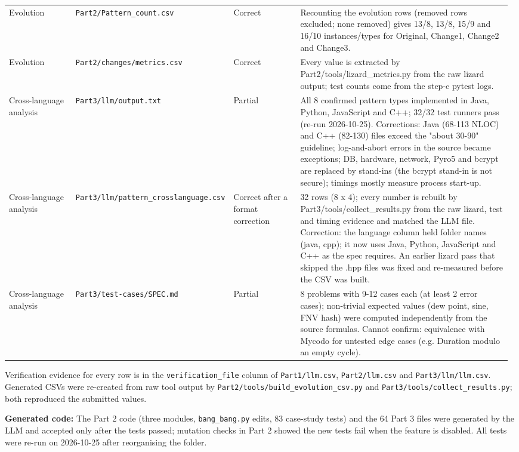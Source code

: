 \documentclass[11pt,a4paper]{article}
\newcommand{\field}[2]{\textbf{#1:} #2\par}
\begin{document}
{\begin{longtable}{@{}P{0.14\linewidth}P{0.25\linewidth}P{0.14\linewidth}P{0.45\linewidth}@{}}
Evolution & \texttt{Part2/\allowbreak{}Pattern\_\allowbreak{}count.\allowbreak{}csv} & Correct & Recounting the evolution rows (removed rows excluded; none removed) gives 13/8, 13/8, 15/9 and 16/10 instances/types for Original, Change1, Change2 and Change3. \\
Evolution & \texttt{Part2/\allowbreak{}changes/\allowbreak{}metrics.\allowbreak{}csv} & Correct & Every value is extracted by Part2/tools/lizard\_metrics.py from the raw lizard output; test counts come from the step-c pytest logs. \\
Cross-language analysis & \texttt{Part3/\allowbreak{}llm/\allowbreak{}output.\allowbreak{}txt} & Partial & All 8 confirmed pattern types implemented in Java, Python, JavaScript and C++; 32/32 test runners pass (re-run 2026-10-25). Corrections: Java (68-113 NLOC) and C++ (82-130) files exceed the "about 30-90" guideline; log-and-abort errors in the source became exceptions; DB, hardware, network, Pyro5 and bcrypt are replaced by stand-ins (the bcrypt stand-in is not secure); timings mostly measure process start-up. \\
Cross-language analysis & \texttt{Part3/\allowbreak{}llm/\allowbreak{}pattern\_\allowbreak{}crosslanguage.\allowbreak{}csv} & Correct after a format correction & 32 rows (8 x 4); every number is rebuilt by Part3/tools/collect\_results.py from the raw lizard, test and timing evidence and matched the LLM file. Correction: the language column held folder names (java, cpp); it now uses Java, Python, JavaScript and C++ as the spec requires. An earlier lizard pass that skipped the .hpp files was fixed and re-measured before the CSV was built. \\
Cross-language analysis & \texttt{Part3/\allowbreak{}test-cases/\allowbreak{}SPEC.\allowbreak{}md} & Partial & 8 problems with 9-12 cases each (at least 2 error cases); non-trivial expected values (dew point, sine, FNV hash) were computed independently from the source formulas. Cannot confirm: equivalence with Mycodo for untested edge cases (e.g. Duration modulo an empty cycle). \\
\bottomrule\end{longtable}}
Verification evidence for every row is in the \texttt{verification\_\allowbreak{}file} column of \texttt{Part1/\allowbreak{}llm.\allowbreak{}csv}, \texttt{Part2/\allowbreak{}llm.\allowbreak{}csv} and \texttt{Part3/\allowbreak{}llm/\allowbreak{}llm.\allowbreak{}csv}. Generated CSVs were re-created from raw tool output by \texttt{Part2/\allowbreak{}tools/\allowbreak{}build\_\allowbreak{}evolution\_\allowbreak{}csv.\allowbreak{}py} and \texttt{Part3/\allowbreak{}tools/\allowbreak{}collect\_\allowbreak{}results.\allowbreak{}py}; both reproduced the submitted values.\par
\field{Generated code}{The Part 2 code (three modules, \texttt{bang\_\allowbreak{}bang.\allowbreak{}py} edits, 83 case-study tests) and the 64 Part 3 files were generated by the LLM and accepted only after the tests passed; mutation checks in Part 2 showed the new tests fail when the feature is disabled. All tests were re-run on 2026-10-25 after reorganising the folder.}
\end{document}
